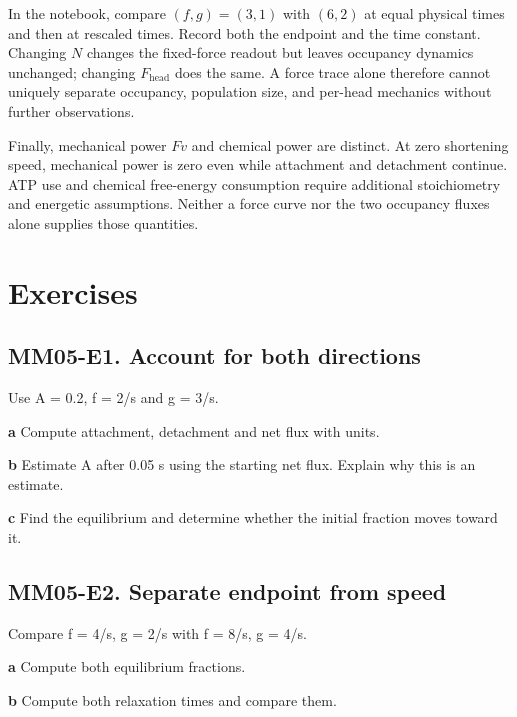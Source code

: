 \documentclass[11pt,letterpaper]{article}
\theoremstyle{definition}\newtheorem{definition}{Definition}\newtheorem{example}{Example}
\numberwithin{equation}{section}
\begin{document}
In the notebook, compare $(f,g)=(3,1)$ with $(6,2)$ at equal physical times and then at rescaled times. Record both the endpoint and the time constant. Changing $N$ changes the fixed-force readout but leaves occupancy dynamics unchanged; changing $F_{\mathrm{head}}$ does the same. A force trace alone therefore cannot uniquely separate occupancy, population size, and per-head mechanics without further observations.

Finally, mechanical power $Fv$ and chemical power are distinct. At zero shortening speed, mechanical power is zero even while attachment and detachment continue. ATP use and chemical free-energy consumption require additional stoichiometry and energetic assumptions. Neither a force curve nor the two occupancy fluxes alone supplies those quantities.
\bigskip
\section*{Exercises}
\par\noindent\begin{minipage}{\linewidth}
\subsection*{MM05-E1. Account for both directions}
Use A =\allowbreak{} 0.2, f =\allowbreak{} 2/s and g =\allowbreak{} 3/s.

\textbf{a} Compute attachment, detachment and net flux with units.

\end{minipage}\par\medskip
\textbf{b} Estimate A after 0.05 s using the starting net flux. Explain why this is an estimate.

\textbf{c} Find the equilibrium and determine whether the initial fraction moves toward it.

\par\noindent\begin{minipage}{\linewidth}
\subsection*{MM05-E2. Separate endpoint from speed}
Compare f =\allowbreak{} 4/s, g =\allowbreak{} 2/s with f =\allowbreak{} 8/s, g =\allowbreak{} 4/s.

\textbf{a} Compute both equilibrium fractions.

\end{minipage}\par\medskip
\textbf{b} Compute both relaxation times and compare them.
\end{document}
